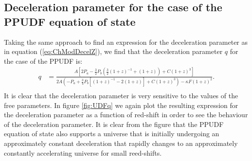 \documentclass[a0,portrait]{a0poster}
\newcommand{\brac}[1]{\left(#1\right)}
\newcommand{\bracc}[1]{\left[#1\right]}
\begin{document}
\begin{multicols}{2}
\section*{Deceleration parameter for the case of the PPUDF equation of state}
Taking the same approach to find an expression for the deceleration parameter as in equation (\ref{eq:ChModDecelZ}), we find that the deceleration parameter $q$ for the case of the PPUDF is:
\begin{equation}\label{eq:UDFq}
\begin{split}
q &= \frac{A\bracc{2P_{a}-\frac{3}{2}P_{b}\brac{\frac{3}{2}\brac{1+z}^{-1}+\brac{1+z}}+C\brac{1+z}^{3}}}{2A\brac{-P_{a}+\frac{3}{4}P_{b}\bracc{\brac{1+z}^{-1}-2\brac{1+z}}+C\brac{1+z}^{3}} -\kappa F \brac{1+z}^{2}}.        \\
\end{split}
\end{equation}
It is clear that the deceleration parameter is very sensitive to the values of the free parameters. In figure \ref{fig:UDFq} we again plot the resulting expression for the deceleration parameter as a function of red-shift in order to see the behaviour of the deceleration parameter.
It is clear from the figure that the PPUDF equation of state also supports a universe that is initially undergoing an approximately constant deceleration that rapidly changes to an approximately constantly accelerating universe for small reed-shifts.


\color{SaddleBrown} %

\end{multicols}
\end{document}
